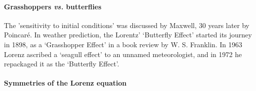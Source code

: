 \paragraph{\protect Grasshoppers {\em vs.} butterflies}{%
The 'sensitivity to initial conditions' was
discussed by Maxwell, 30 years later by Poincar\'e.
In weather prediction, the
Lorentz' `Butterfly Effect' started its journey in
1898, as a `Grasshopper Effect' in a book review by
W. S. Franklin.  In 1963 Lorenz
ascribed a `seagull effect' to an unnamed meteorologist,
and in 1972 he repackaged it as the `Butterfly Effect'.
           } %

%
\paragraph{Symmetries of the Lorenz equation}\label{rem:LorenzSymm}

